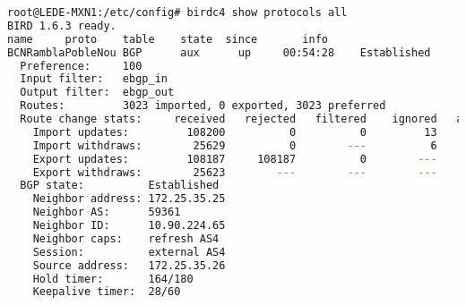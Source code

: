 \begin{lstlisting}[language=bash, caption={Birdc Simple \texttt{Show Protocols all}. Truncated to show BGP.}]
root@LEDE-MXN1:/etc/config# birdc4 show protocols all
BIRD 1.6.3 ready.
name     proto    table    state  since       info
BCNRamblaPobleNou BGP      aux      up     00:54:28    Established
  Preference:     100
  Input filter:   ebgp_in
  Output filter:  ebgp_out
  Routes:         3023 imported, 0 exported, 3023 preferred
  Route change stats:     received   rejected   filtered    ignored   accepted
    Import updates:         108200          0          0         13     108187
    Import withdraws:        25629          0        ---          6      25623
    Export updates:         108187     108187          0        ---          0
    Export withdraws:        25623        ---        ---        ---          0
  BGP state:          Established
    Neighbor address: 172.25.35.25
    Neighbor AS:      59361
    Neighbor ID:      10.90.224.65
    Neighbor caps:    refresh AS4
    Session:          external AS4
    Source address:   172.25.35.26
    Hold timer:       164/180
    Keepalive timer:  28/60
\end{lstlisting}